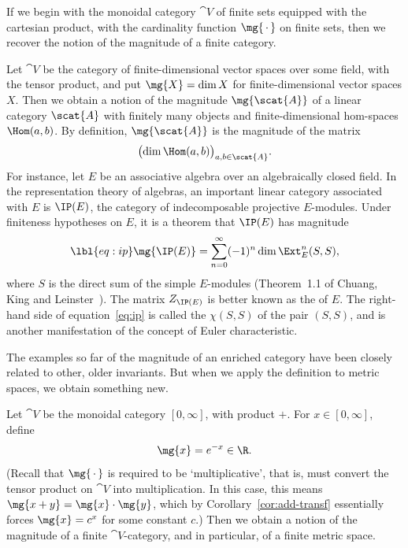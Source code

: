\begin{example}
If we begin with the monoidal category $\cat{V}$ of finite sets equipped
with the cartesian product, with the cardinality function
$\mg{\mbox{\ensuremath{\,\cdot\,}}}$ on finite sets, then we recover the
notion of the magnitude of a finite category.
\end{example}

\begin{example}
Let $\cat{V}$ be the category of finite-dimensional vector spaces over some
field, with the tensor product, and put $\mg{X} = \dim X$ for
finite-dimensional vector spaces $X$.  Then we obtain a notion of the
magnitude $\mg{\scat{A}}$ of a linear category $\scat{A}$ with finitely
many objects and finite-dimensional hom-spaces $\Hom(a, b)$.  By
definition, $\mg{\scat{A}}$ is the magnitude of the matrix
\[
\bigl( \dim \Hom(a, b) \bigr)_{a, b \in \scat{A}}.
\]
For instance, let $E$ be an associative algebra%
% 
% 
over an algebraically closed field.  In the representation theory of
algebras, an important linear category associated with $E$ is $\IP(E)$, the
category of indecomposable%
% 
% 
projective%
% 
% 
$E$-modules.  Under finiteness hypotheses on $E$, it is a theorem that
$\IP(E)$ has magnitude
% 
\begin{equation}
\lbl{eq:ip}
\mg{\IP(E)} 
=
\sum_{n = 0}^\infty (-1)^n \dim \Ext_E^n(S, S),
\end{equation}
% 
where $S$ is the direct sum of the simple $E$-modules (Theorem~1.1 of
Chuang,%
%
%
King%
%
% 
and Leinster~\cite{MFDA}).  The
matrix $Z_{\IP(E)}$ is better known as the  of $E$.  The right-hand side of equation~\eqref{eq:ip} is called
the  $\chi(S, S)$ of the pair $(S, S)$, and is another manifestation of
the concept of Euler characteristic.
\end{example}

The examples so far of the magnitude of an enriched category have been
closely related to other, older invariants.  But when we apply the
definition to metric spaces, we obtain something new.

Let $\cat{V}$ be the monoidal category $[0, \infty]$, with product $+$.
For $x \in [0, \infty]$, define
\[
\mg{x} = e^{-x} \in \R.
\]
(Recall that $\mg{\,\cdot\,}$ is required to be `multiplicative', that is,
must convert the tensor product on $\cat{V}$ into multiplication.  In
this case, this means $\mg{x + y} = \mg{x} \cdot \mg{y}$, which by
Corollary~\ref{cor:add-transf} essentially forces
$\mg{x} = c^x$ for some constant $c$.)  Then we obtain a notion of the
magnitude of a finite $\cat{V}$-category, and in particular, of a finite
metric space.

